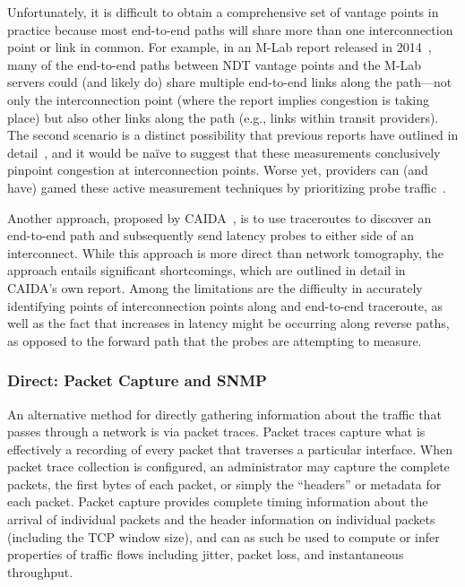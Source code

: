 Unfortunately, it is difficult to obtain a comprehensive set of vantage
points in practice because most end-to-end paths will share more than
one interconnection point or link in common. For example, in an M-Lab
report released in 2014~\cite{mlab-congestion}, many of the end-to-end paths between NDT
vantage points and the M-Lab servers could (and likely do) share
multiple end-to-end links along the path---not only the interconnection
point (where the report implies congestion is taking place) but also
other links along the path (e.g., links within transit providers).  The
second scenario is a
distinct possibility that previous reports have outlined in
detail~\cite{ftt-congestion-2015}, and it would be na\"{i}ve to suggest that
these 
measurements conclusively pinpoint congestion at interconnection
points. Worse yet, providers can (and have) gamed these active
measurement techniques by prioritizing probe traffic~\cite{kilmer2014}.

Another approach, proposed by CAIDA~\cite{www-caida}, is to use traceroutes to
discover an end-to-end 
path and subsequently send latency probes to either side of an
interconnect. While this approach is more direct than network
tomography, the approach entails significant shortcomings, which are
outlined in detail in CAIDA's own report. Among the limitations are the
difficulty in accurately identifying points of interconnection points
along and end-to-end traceroute, as well as the fact that increases in
latency might be occurring along reverse paths, as opposed to the
forward path that the probes are attempting to measure. 

\subsubsection{Direct: Packet Capture and SNMP}

An alternative method for directly gathering information about the traffic that
passes through a network is via packet traces.  Packet traces capture
what is effectively a recording of every packet that traverses a
particular interface. When packet trace collection is configured, an
administrator may capture the complete packets, the first bytes of each
packet, or simply the ``headers'' or metadata for each packet. Packet
capture provides complete timing information about the arrival of
individual packets and the header information on individual packets
(including the TCP window size), and can as such be used to compute or
infer properties of traffic flows including jitter, packet loss, and
instantaneous throughput.  

